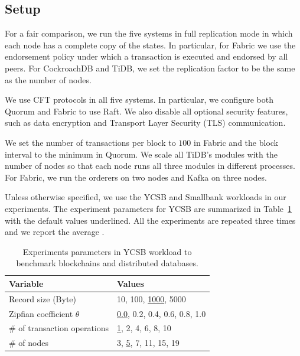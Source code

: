 \subsection{Setup}
For a fair comparison, we run the five systems in full replication mode in which each node has a complete
copy of the states. In particular, for Fabric we use the endorsement policy under which a transaction
is executed and endorsed by all peers. For CockroachDB and TiDB, we set the replication factor to be the
same as the number of nodes. 

We use CFT protocols in all five systems. In particular, we configure both Quorum and Fabric to use Raft. 
We also disable all optional security features, such as data encryption and
Transport Layer Security (TLS) communication. 

We set the number of transactions per block to $100$ in Fabric and the block interval to the
minimum in Quorum. We scale all TiDB's modules with the number of nodes so that each node runs all three
modules in different processes. For Fabric, we run the orderers on two nodes and Kafka on three nodes.

Unless otherwise specified, we use the YCSB and Smallbank workloads in our experiments. The experiment
parameters for YCSB are summarized in Table~\ref{twin:tab:parameter} with the default values underlined. 
All the experiments are repeated three times and we report the average .

\begin{table}
	\centering
	\caption{Experiments parameters in YCSB workload to benchmark blockchains and distributed databases. }
	\label{twin:tab:parameter}
	\begin{tabular}{@{}ll@{}}
	\toprule
	\textbf{Variable}               & \textbf{Values}               \\
	\midrule
	Record size (Byte)               & 10, 100, \underline{1000}, 5000          \\
	Zipfian coefficient $\theta$       & \underline{0.0}, 0.2, 0.4, 0.6, 0.8, 1.0 \\
	\# of transaction operations & \underline{1}, 2, 4, 6, 8, 10            \\
	\# of nodes & 3, \underline{5}, 7, 11, 15, 19            \\
	\bottomrule
	\end{tabular}
\end{table}


